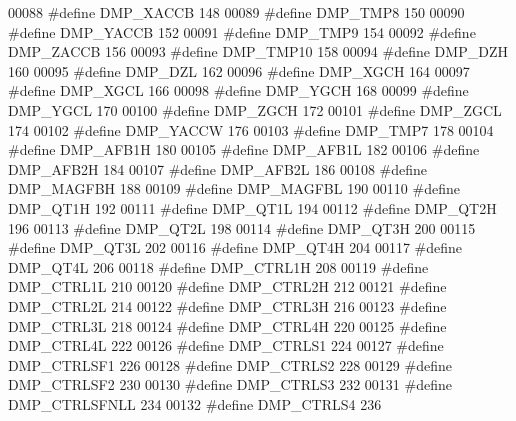 \begin{DoxyCode}
00088 \textcolor{preprocessor}{#define DMP\_XACCB    148}
00089 \textcolor{preprocessor}{#define DMP\_TMP8    150}
00090 \textcolor{preprocessor}{#define DMP\_YACCB    152}
00091 \textcolor{preprocessor}{#define DMP\_TMP9    154}
00092 \textcolor{preprocessor}{#define DMP\_ZACCB    156}
00093 \textcolor{preprocessor}{#define DMP\_TMP10    158}
00094 \textcolor{preprocessor}{#define DMP\_DZH    160}
00095 \textcolor{preprocessor}{#define DMP\_DZL    162}
00096 \textcolor{preprocessor}{#define DMP\_XGCH    164}
00097 \textcolor{preprocessor}{#define DMP\_XGCL    166}
00098 \textcolor{preprocessor}{#define DMP\_YGCH    168}
00099 \textcolor{preprocessor}{#define DMP\_YGCL    170}
00100 \textcolor{preprocessor}{#define DMP\_ZGCH    172}
00101 \textcolor{preprocessor}{#define DMP\_ZGCL    174}
00102 \textcolor{preprocessor}{#define DMP\_YACCW    176}
00103 \textcolor{preprocessor}{#define DMP\_TMP7    178}
00104 \textcolor{preprocessor}{#define DMP\_AFB1H    180}
00105 \textcolor{preprocessor}{#define DMP\_AFB1L    182}
00106 \textcolor{preprocessor}{#define DMP\_AFB2H    184}
00107 \textcolor{preprocessor}{#define DMP\_AFB2L    186}
00108 \textcolor{preprocessor}{#define DMP\_MAGFBH    188}
00109 \textcolor{preprocessor}{#define DMP\_MAGFBL    190}
00110 \textcolor{preprocessor}{#define DMP\_QT1H    192}
00111 \textcolor{preprocessor}{#define DMP\_QT1L    194}
00112 \textcolor{preprocessor}{#define DMP\_QT2H    196}
00113 \textcolor{preprocessor}{#define DMP\_QT2L    198}
00114 \textcolor{preprocessor}{#define DMP\_QT3H    200}
00115 \textcolor{preprocessor}{#define DMP\_QT3L    202}
00116 \textcolor{preprocessor}{#define DMP\_QT4H    204}
00117 \textcolor{preprocessor}{#define DMP\_QT4L    206}
00118 \textcolor{preprocessor}{#define DMP\_CTRL1H    208}
00119 \textcolor{preprocessor}{#define DMP\_CTRL1L    210}
00120 \textcolor{preprocessor}{#define DMP\_CTRL2H    212}
00121 \textcolor{preprocessor}{#define DMP\_CTRL2L    214}
00122 \textcolor{preprocessor}{#define DMP\_CTRL3H    216}
00123 \textcolor{preprocessor}{#define DMP\_CTRL3L    218}
00124 \textcolor{preprocessor}{#define DMP\_CTRL4H    220}
00125 \textcolor{preprocessor}{#define DMP\_CTRL4L    222}
00126 \textcolor{preprocessor}{#define DMP\_CTRLS1    224}
00127 \textcolor{preprocessor}{#define DMP\_CTRLSF1    226}
00128 \textcolor{preprocessor}{#define DMP\_CTRLS2    228}
00129 \textcolor{preprocessor}{#define DMP\_CTRLSF2    230}
00130 \textcolor{preprocessor}{#define DMP\_CTRLS3    232}
00131 \textcolor{preprocessor}{#define DMP\_CTRLSFNLL    234}
00132 \textcolor{preprocessor}{#define DMP\_CTRLS4    236}

\end{DoxyCode}
